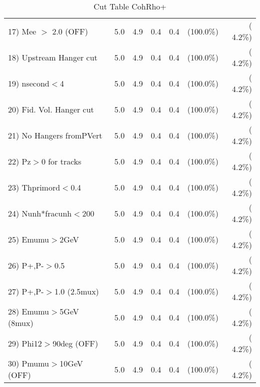 \begin{table}[h!]
\begin{tabular}{||l||r|r|r|r|r|r||}
 17) Mee $>$ 2.0  (OFF)   &          5.0 &          4.9 &          0.4 &          0.4 & (100.0\%) & (  4.2\%) \\
 18) Upstream Hanger cut  &          5.0 &          4.9 &          0.4 &          0.4 & (100.0\%) & (  4.2\%) \\
 19) nsecond$<$4          &          5.0 &          4.9 &          0.4 &          0.4 & (100.0\%) & (  4.2\%) \\
 20) Fid. Vol. Hanger cut &          5.0 &          4.9 &          0.4 &          0.4 & (100.0\%) & (  4.2\%) \\
 21) No Hangers fromPVert &          5.0 &          4.9 &          0.4 &          0.4 & (100.0\%) & (  4.2\%) \\
 22) Pz$>$0 for tracks    &          5.0 &          4.9 &          0.4 &          0.4 & (100.0\%) & (  4.2\%) \\
 23) Thprimord$<$0.4      &          5.0 &          4.9 &          0.4 &          0.4 & (100.0\%) & (  4.2\%) \\
 24) Nunh*fracunh$<$200   &          5.0 &          4.9 &          0.4 &          0.4 & (100.0\%) & (  4.2\%) \\
 25) Emumu$>$2GeV         &          5.0 &          4.9 &          0.4 &          0.4 & (100.0\%) & (  4.2\%) \\
 26) P+,P-$>$0.5          &          5.0 &          4.9 &          0.4 &          0.4 & (100.0\%) & (  4.2\%) \\
 27) P+,P-$>$1.0 (2.5mux) &          5.0 &          4.9 &          0.4 &          0.4 & (100.0\%) & (  4.2\%) \\
 28) Emumu$>$5GeV  (8mux) &          5.0 &          4.9 &          0.4 &          0.4 & (100.0\%) & (  4.2\%) \\
 29) Phi12$>$90deg  (OFF) &          5.0 &          4.9 &          0.4 &          0.4 & (100.0\%) & (  4.2\%) \\
 30) Pmumu$>$10GeV  (OFF) &          5.0 &          4.9 &          0.4 &          0.4 & (100.0\%) & (  4.2\%) \\
 \hline
 \hline
 \end{tabular}
 \caption{Cut Table  CohRho+  }
 \label{tab-cutcohjpsi-mumu_anumunc}
 \end{table}
